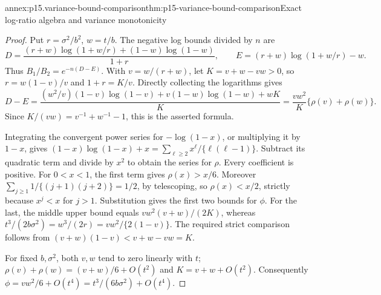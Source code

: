 \begin{annexitem}{annex:p15.variance-bound-comparison}{thm:p15-variance-bound-comparison}{Exact log-ratio algebra and variance monotonicity}
\begin{proof}
Put \(r=\sigma^2/b^2\), \(w=t/b\). The negative log bounds divided by
\(n\) are
\[
 D=\frac{(r+w)\log(1+w/r)+(1-w)\log(1-w)}{1+r},
 \qquad E=(r+w)\log(1+w/r)-w.
\]
Thus \(B_1/B_2=e^{-n(D-E)}\).
With \(v=w/(r+w)\), let \(K=v+w-vw>0\), so
\(r=w(1-v)/v\) and \(1+r=K/v\). Directly collecting the logarithms gives
\[
 D-E=\frac{
  (w^2/v)(1-v)\log(1-v)+v(1-w)\log(1-w)+wK}{K}
 =\frac{vw^2}{K}\{\rho(v)+\rho(w)\}.
\]
Since \(K/(vw)=v^{-1}+w^{-1}-1\), this is the asserted formula.

Integrating the convergent power series for \(-\log(1-x)\), or
multiplying it by \(1-x\), gives
\((1-x)\log(1-x)+x=\sum_{\ell\geq2}x^\ell/\{\ell(\ell-1)\}\).
Subtract its quadratic term and divide by \(x^2\) to obtain the
series for \(\rho\). Every coefficient is positive.
For \(0<x<1\), the first term gives \(\rho(x)>x/6\).
Moreover
\(\sum_{j\geq1}1/\{(j+1)(j+2)\}=1/2\), by telescoping, so
\(\rho(x)<x/2\), strictly because \(x^j<x\) for \(j>1\).
Substitution gives the first two bounds for \(\phi\).
For the last, the middle upper bound equals
\(vw^2(v+w)/(2K)\), whereas
\(t^3/(2b\sigma^2)=w^3/(2r)=vw^2/\{2(1-v)\}\).
The required strict comparison follows from
\((v+w)(1-v)<v+w-vw=K\).

For fixed \(b,\sigma^2\), both \(v,w\) tend to zero linearly with \(t\);
\(\rho(v)+\rho(w)=(v+w)/6+O(t^2)\) and
\(K=v+w+O(t^2)\). Consequently
\(\phi=vw^2/6+O(t^4)=t^3/(6b\sigma^2)+O(t^4)\).


\end{proof}
\end{annexitem}
